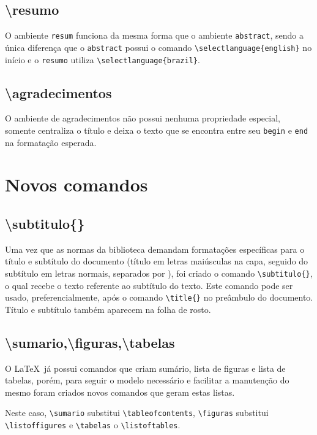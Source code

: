 \documentclass{fei}
\begin{document}
    \subsection{\textbackslash resumo}
    O ambiente \texttt{resum} funciona da mesma forma que o ambiente \texttt{abstract}, sendo a única diferença que o \texttt{abstract} possui o comando \verb+\selectlanguage{english}+ no início e o \texttt{resumo} utiliza \verb+\selectlanguage{brazil}+.

    \subsection{\textbackslash agradecimentos}
    O ambiente de agradecimentos não possui nenhuma propriedade especial, somente centraliza o título e deixa o texto que se encontra entre seu \texttt{begin} e \texttt{end} na formatação esperada.

\section{Novos comandos}
    
    \subsection{\textbackslash subtitulo\{\}}
    Uma vez que as normas da biblioteca demandam formatações específicas para o título e subtítulo do documento (título em letras maiúsculas na capa, seguido do subtítulo em letras normais, separados por \aspas{:}), foi criado o comando \verb+\subtitulo{}+, o qual recebe o texto referente ao subtítulo do texto. Este comando pode ser usado, preferencialmente, após o comando \verb+\title{}+ no preâmbulo do documento. Título e subtítulo também aparecem na folha de rosto.
    
    \subsection{\textbackslash sumario,\textbackslash figuras,\textbackslash tabelas}
    O \index{\LaTeX}\LaTeX~já possui comandos que criam sumário, lista de figuras e lista de tabelas, porém, para seguir o modelo necessário e facilitar a manutenção do mesmo foram criados novos comandos que geram estas listas.

    Neste caso, \verb+\sumario+ substitui \verb+\tableofcontents+, \verb+\figuras+ substitui \verb+\listoffigures+ e \verb+\tabelas+ o \verb+\listoftables+.
\end{document}
